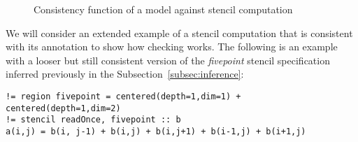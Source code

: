 \documentclass[9pt]{sigplanconf}
\theoremstyle{definition}
\begin{document}
\begin{figure}

\caption{Consistency function of a model against stencil computation}
\label{fig:consistency}
\end{figure}

We will consider an extended example of a stencil computation that is
consistent with its annotation to show how checking works. The following is an
example with a looser but still consistent version of the \textit{fivepoint}
stencil specification inferred previously in the
Subsection~\ref{subsec:inference}:
%
\begin{verbatim}
!= region fivepoint = centered(depth=1,dim=1) + centered(depth=1,dim=2)
!= stencil readOnce, fivepoint :: b
a(i,j) = b(i, j-1) + b(i,j) + b(i,j+1) + b(i-1,j) + b(i+1,j)
\end{verbatim}
%
\end{document}
